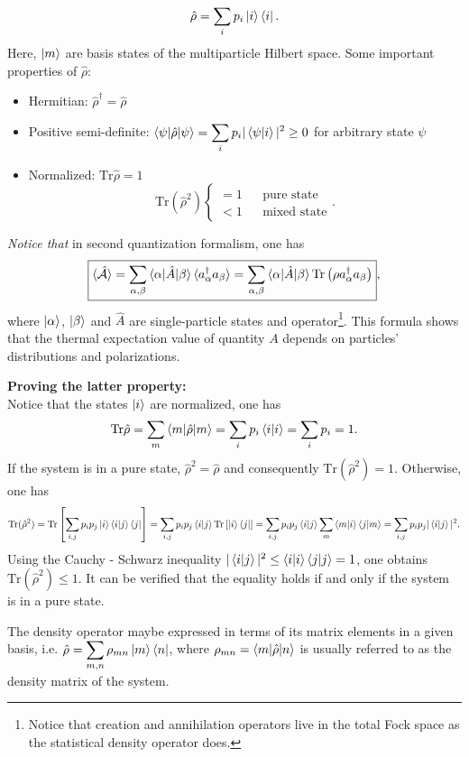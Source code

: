 \documentclass[a4paper,12pts,dvipsnames]{article}
\numberwithin{equation}{section}
\begin{document}
\begin{equation}
\hat{\rho} = \sum_i p_i\ket{i}\bra{i}.
\end{equation}
Here, $\ket{m}$ are basis states of the multiparticle Hilbert space. Some important properties of $\hat{\rho}$:
\begin{itemize}
	\item Hermitian: $\hat{\rho}^{\dagger}=\hat{\rho}$
	\item Positive semi-definite: $\braket{\psi|\hat{\rho}|\psi} = \displaystyle\sum_ip_i|\braket{\psi|i}|^2\ge 0$ for arbitrary state $\psi$
	\item Normalized: $\text{Tr}\hat{\rho} = 1$
	\begin{equation*}
	\text{Tr}(\hat{\rho}^2) \left\lbrace\begin{array}{rcl}
	=1 && \text{pure state} \\ <1 && \text{mixed state}
	\end{array}\right. .
	\end{equation*}
\end{itemize}
\textit{Notice that} in second quantization formalism, one has
\begin{equation}
	\boxed{\braket{\hat{\mathcal{A}}} = \sum_{\alpha,\beta}\braket{\alpha|\hat{A}|\beta}\braket{a^{\dagger}_{\alpha}a_{\beta}} = \sum_{\alpha,\beta}\braket{\alpha|\hat{A}|\beta}\text{Tr}\left(\rho a^{\dagger}_{\alpha}a_{\beta}\right)},
\end{equation}
where $\ket{\alpha}$, $\ket{\beta}$ and $\hat{A}$ are single-particle states and operator\footnote{Notice that creation and annihilation operators live in the total Fock space as the statistical density operator does.}. This formula shows that the thermal expectation value of quantity $A$ depends on particles' distributions and polarizations.
\begin{mdframed}[backgroundcolor=gray!16]
	\textbf{Proving the latter property:}\\
	Notice that the states $\ket{i}$ are normalized, one has
	\begin{equation}
		\text{Tr}\hat{\rho} = \sum_{m}\braket{m|\hat{\rho}|m} = \sum_{i}p_i\braket{i|i} = \sum_ip_i = 1.
	\end{equation}
	If the system is in a pure state, $\hat{\rho}^2=\hat{\rho}$ and consequently $\text{Tr}(\hat{\rho}^2)=1$. Otherwise, one has
	\begin{align}
		\text{Tr}(\hat{\rho}^2) = \text{Tr}\left[\sum_{i,j}p_ip_j\ket{i}\braket{i|j}\bra{j}\right] = \sum_{i,j}p_ip_j\braket{i|j}\text{Tr}\left[\ket{i}\bra{j}\right] = \sum_{i,j}p_ip_j\braket{i|j}\sum_m\braket{m|i}\braket{j|m} = \sum_{i,j}p_ip_j|\braket{i|j}|^2.
	\end{align}
	Using the Cauchy - Schwarz inequality $|\braket{i|j}|^2\le\braket{i|i}\braket{j|j}=1$, one obtains $\text{Tr}(\hat{\rho}^2)\le1$. It can be verified that the equality holds if and only if the system is in a pure state.
\end{mdframed}
The density operator maybe expressed in terms of its matrix elements in a given basis, i.e. $\hat{\rho} = \displaystyle\sum_{m,n}\rho_{mn}\ket{m}\bra{n}$, where $\rho_{mn} = \braket{m|\hat{\rho}|n}$ is usually referred to as the density matrix of the system.
\end{document}
